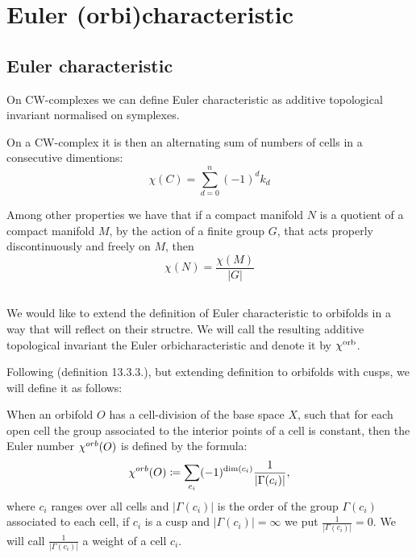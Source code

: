 

\section{Euler (orbi)characteristic}\label{E_orb}
\label{\Eoc_as_a_sum}
\subsection{Euler characteristic}
On CW-complexes we can define Euler characteristic as additive topological invariant 
normalised on symplexes.

On a CW-complex it is then an alternating sum of numbers of cells in 
a consecutive dimentions: 
\begin{equation}
\chi(C) = \sum_{d = 0}^n (-1)^d k_d
\end{equation}

Among other properties we have that if a compact manifold $N$ is a quotient of a compact 
manifold $M$, 
by the action of a finite group $G$, that acts properly discontinuously and freely on $M$, then
\begin{equation}
\chi(N) = \frac{\chi(M)}{|G|}
\end{equation}   


\subsection{\Eoc}\label{Eoc}\label{extended_Euler_orbicharacteristic}
We would like to extend the definition of Euler characteristic to orbifolds in a way 
that will reflect on their structre. 
We will call the resulting additive topological invariant the Euler orbicharacteristic 
and denote it by $\chi^{\rm orb}$.


Following \cite{Thurston1979} (definition 13.3.3.), but extending 
definition to orbifolds with cusps, we will define it as follows:
\begin{definition}
When an orbifold $O$ has a cell-division of the base space $X$, such that for each
open cell the group associated to
the interior points of a cell is constant, then the Euler number ${\chi^{orb}(O)}$ is defined by
the formula:
\begin{equation}
{\chi^{orb}(O)} \coloneqq \sum_{c_i} (-1)^{ \mathrm{dim}(c_i)}\frac{1}{|\Gamma(c_i)|},
\end{equation}
where $c_i$ ranges over all cells and $|\Gamma(c_i)|$ is the order of the group $\Gamma(c_i)$ 
associated to each cell, if $c_i$ is a cusp and $|\Gamma(c_i)| = \infty$ we put 
$\frac{1}{|\Gamma(c_i)|} = 0$. We will call $\frac{1}{|\Gamma(c_i)|}$ a weight of a cell $c_i$.
\end{definition} 

